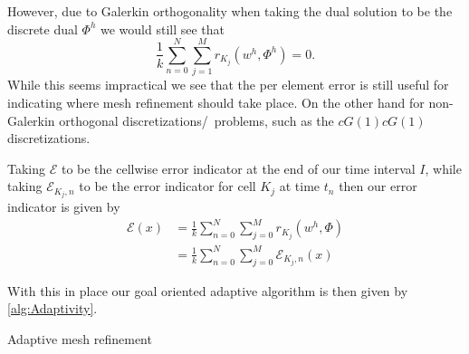 However, due to Galerkin orthogonality when taking the dual solution to be
the discrete dual $\Phi^h$ we would still see that
\begin{equation*}
    \frac{1}{k} \sum_{n=0}^N \sum_{j=1}^M r_{K_j}(w^h, \Phi^h) = 0.
\end{equation*}
While this seems impractical we see that the per element error is still useful
for indicating where mesh refinement should take place. On the other hand for
non-Galerkin orthogonal discretizations\slash~problems, such as the $cG(1)cG(1)$
discretizations.

Taking $\mathcal{E}$ to be the cellwise error indicator at the end of our time
interval $I$, while taking $\mathcal{E}_{K_j, n}$ to be
the error indicator for cell $K_j$ at time $t_n$ then our error indicator is
given by
\begin{equation}
    \begin{split}
    \mathcal{E}(x) &= \frac{1}{k} \sum_{n=0}^N \sum_{j=0}^M r_{K_j}(w^h, \Phi) \\
                &= \frac{1}{k} \sum_{n=0}^N \sum_{j=0}^M \mathcal{E}_{K_j, n}(x)
    \end{split}
    \label{eq:ErrorIndicator}
\end{equation}

With this in place our goal oriented adaptive algorithm is then given by
\autoref{alg:Adaptivity}.
\begin{algorithm}[!htp]
  \caption{Adaptive mesh refinement} \label{alg:Adaptivity}
\begin{minipage}[t]{\columnwidth} %
  \SetAlgoLined
\end{minipage}
\end{algorithm}
